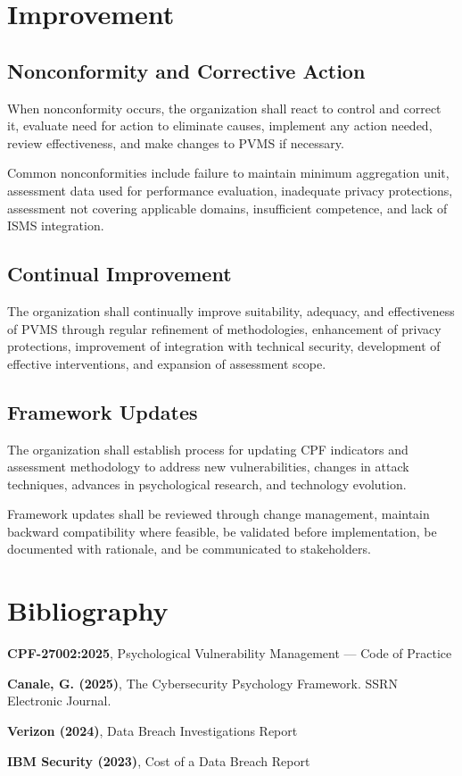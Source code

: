 \documentclass[11pt,a4paper]{article}
\begin{document}
\section{Improvement}

\subsection{Nonconformity and Corrective Action}

When nonconformity occurs, the organization shall react to control and correct it, evaluate need for action to eliminate causes, implement any action needed, review effectiveness, and make changes to PVMS if necessary.

Common nonconformities include failure to maintain minimum aggregation unit, assessment data used for performance evaluation, inadequate privacy protections, assessment not covering applicable domains, insufficient competence, and lack of ISMS integration.

\subsection{Continual Improvement}

The organization shall continually improve suitability, adequacy, and effectiveness of PVMS through regular refinement of methodologies, enhancement of privacy protections, improvement of integration with technical security, development of effective interventions, and expansion of assessment scope.

\subsection{Framework Updates}

The organization shall establish process for updating CPF indicators and assessment methodology to address new vulnerabilities, changes in attack techniques, advances in psychological research, and technology evolution.

Framework updates shall be reviewed through change management, maintain backward compatibility where feasible, be validated before implementation, be documented with rationale, and be communicated to stakeholders.

\section*{Bibliography}

\textbf{CPF-27002:2025}, Psychological Vulnerability Management — Code of Practice

\textbf{Canale, G. (2025)}, The Cybersecurity Psychology Framework. SSRN Electronic Journal.

\textbf{Verizon (2024)}, Data Breach Investigations Report

\textbf{IBM Security (2023)}, Cost of a Data Breach Report
\end{document}
